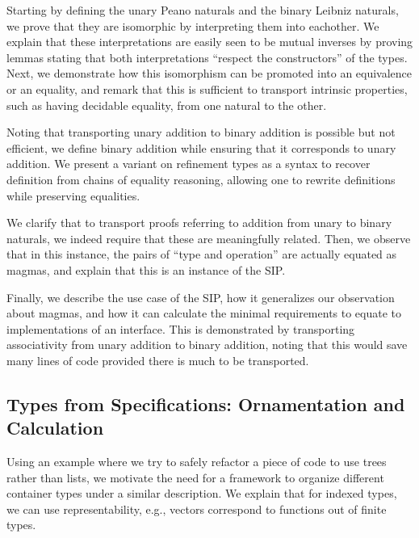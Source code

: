 \documentclass{article}
\theoremstyle{plain}%
\theoremstyle{definition}
\begin{document}
Starting by defining the unary Peano naturals and the binary Leibniz naturals, we prove that they are isomorphic by interpreting them into eachother. We explain that these interpretations are easily seen to be mutual inverses by proving lemmas stating that both interpretations ``respect the constructors'' of the types. Next, we demonstrate how this isomorphism can be promoted into an equivalence or an equality, and remark that this is sufficient to transport intrinsic properties, such as having decidable equality, from one natural to the other.

Noting that transporting unary addition to binary addition is possible but not efficient, we define binary addition while ensuring that it corresponds to unary addition. We present a variant on refinement types as a syntax to recover definition from chains of equality reasoning, allowing one to rewrite definitions while preserving equalities.

We clarify that to transport proofs referring to addition from unary to binary naturals, we indeed require that these are meaningfully related. Then, we observe that in this instance, the pairs of ``type and operation'' are actually equated as magmas, and explain that this is an instance of the SIP.

Finally, we describe the use case of the SIP, how it generalizes our observation about magmas, and how it can calculate the minimal requirements to equate to implementations of an interface. This is demonstrated by transporting associativity from unary addition to binary addition, noting that this would save many lines of code provided there is much to be transported.

%
\subsection{Types from Specifications: Ornamentation and Calculation}\label{sec:numrep}
Using an example where we try to safely refactor a piece of code to use trees rather than lists, we motivate the need for a framework to organize different container types under a similar description. We explain that for indexed types, we can use representability, e.g., vectors correspond to functions out of finite types.
\end{document}
